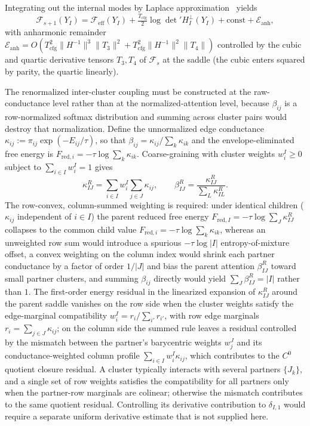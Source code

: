 \documentclass[11pt]{article}
\begin{document}
Integrating out the internal modes by Laplace approximation~\cite{Cardy1996} yields
\begin{equation}
\mathcal{F}_{s+1}(Y_I) = \mathcal{F}_{\mathrm{eff}}(Y_I) + \tfrac{T_{\mathrm{cfg}}}{2}\log\det{}'H_I^\perp(Y_I) + \mathrm{const} + \mathcal{E}_{\mathrm{anh}},
\label{eq:rg_laplace}
\end{equation}
with anharmonic remainder $\mathcal{E}_{\mathrm{anh}} = O(T_{\mathrm{cfg}}^2 \|H^{-1}\|^3 \|T_3\|^2 + T_{\mathrm{cfg}}^2 \|H^{-1}\|^2 \|T_4\|)$ controlled by the cubic and quartic derivative tensors $T_3, T_4$ of $\mathcal{F}_s$ at the saddle (the cubic enters squared by parity, the quartic linearly).

The renormalized inter-cluster coupling must be constructed at the raw-conductance level rather than at the normalized-attention level, because $\beta_{ij}$ is a row-normalized softmax distribution and summing across cluster pairs would destroy that normalization. Define the unnormalized edge conductance $\kappa_{ij} := \pi_{ij}\exp(-E_{ij}/\tau)$, so that $\beta_{ij} = \kappa_{ij}/\sum_k \kappa_{ik}$ and the envelope-eliminated free energy is $F_{\mathrm{red},i} = -\tau \log \sum_k \kappa_{ik}$. Coarse-graining with cluster weights $w_i^I \ge 0$ subject to $\sum_{i \in I} w_i^I = 1$ gives
\begin{equation}
\kappa_{IJ}^R = \sum_{i \in I} w_i^I \sum_{j \in J} \kappa_{ij}, \qquad \beta_{IJ}^R = \frac{\kappa_{IJ}^R}{\sum_L \kappa_{IL}^R}.
\label{eq:rg_inter_cluster}
\end{equation}
The row-convex, column-summed weighting is required: under identical children ($\kappa_{ij}$ independent of $i \in I$) the parent reduced free energy $F_{\mathrm{red},I} = -\tau \log \sum_J \kappa_{IJ}^R$ collapses to the common child value $F_{\mathrm{red},i} = -\tau \log \sum_k \kappa_{ik}$, whereas an unweighted row sum would introduce a spurious $-\tau \log |I|$ entropy-of-mixture offset, a convex weighting on the column index would shrink each partner conductance by a factor of order $1/|J|$ and bias the parent attention $\beta_{IJ}^R$ toward small partner clusters, and summing $\beta_{ij}$ directly would yield $\sum_J \beta_{IJ}^R = |I|$ rather than $1$. The first-order energy residual in the linearized expansion of $\kappa_{IJ}^R$ around the parent saddle vanishes on the row side when the cluster weights satisfy the edge-marginal compatibility $w_i^I = r_i/\sum_{i'} r_{i'}$, with row edge marginals $r_i = \sum_{j \in J} \kappa_{ij}$; on the column side the summed rule leaves a residual controlled by the mismatch between the partner's barycentric weights $w_j^J$ and its conductance-weighted column profile $\sum_{i \in I} w_i^I \kappa_{ij}$, which contributes to the $C^0$ quotient closure residual. A cluster typically interacts with several partners $\{J_k\}$, and a single set of row weights satisfies the compatibility for all partners only when the partner-row marginals are colinear; otherwise the mismatch contributes to the same quotient residual. Controlling its derivative contribution to $\delta_{I,1}$ would require a separate uniform derivative estimate that is not supplied here.
\end{document}
